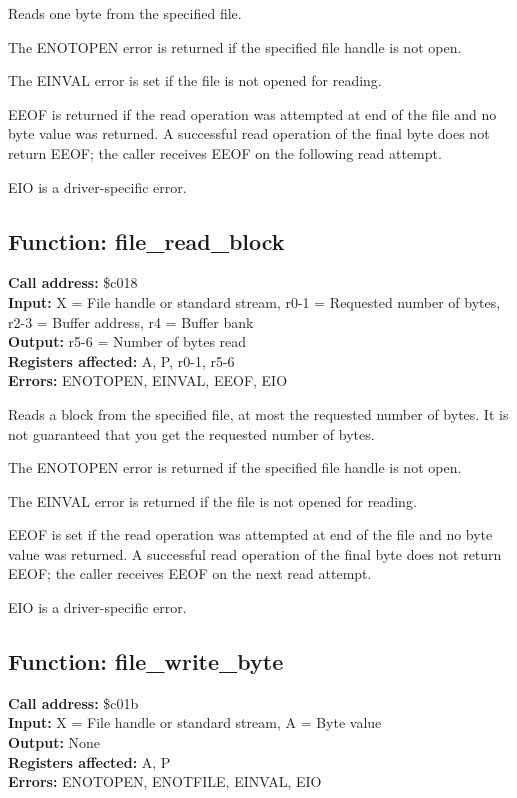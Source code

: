 Reads one byte from the specified file.

The ENOTOPEN error is returned if the specified file handle is not open.

The EINVAL error is set if the file is not opened for reading.

EEOF is returned if the read operation was attempted at end of the file and 
no byte value was returned. A successful read operation of the final byte does 
not return EEOF; the caller receives EEOF on the following read attempt.

EIO is a driver-specific error.


\subsection{Function: file\_read\_block}

\textbf{Call address:} \$c018\\
\textbf{Input:} X = File handle or standard stream, r0-1 = Requested number of bytes, r2-3 = Buffer address, r4 = Buffer bank \\
\textbf{Output:} r5-6 = Number of bytes read \\
\textbf{Registers affected:} A, P, r0-1, r5-6 \\
\textbf{Errors:} ENOTOPEN, EINVAL, EEOF, EIO

Reads a block from the specified file, at most the requested number of bytes. It is not guaranteed that
you get the requested number of bytes.

The ENOTOPEN error is returned if the specified file handle is not open.

The EINVAL error is returned if the file is not opened for reading.

EEOF is set if the read operation was attempted at end of the file and 
no byte value was returned. A successful read operation of the final byte does 
not return EEOF; the caller receives EEOF on the next read attempt.

EIO is a driver-specific error.


\subsection{Function: file\_write\_byte}

\textbf{Call address:} \$c01b\\
\textbf{Input:} X = File handle or standard stream, A = Byte value \\
\textbf{Output:} None \\
\textbf{Registers affected:} A, P \\
\textbf{Errors:} ENOTOPEN, ENOTFILE, EINVAL, EIO

